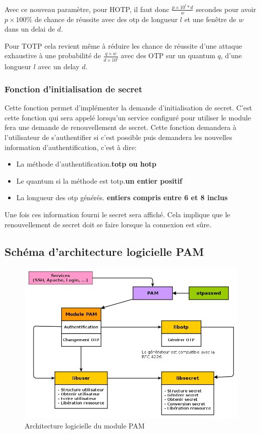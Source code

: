 Avec ce nouveau paramètre, pour HOTP, il faut donc $\frac{p\times10^{l}*d}{w}$
secondes pour avoir $p\times100\%$ de chance de réussite avec des otp de
longueur $l$ et une fenêtre de $w$ dans un delai de $d$.

Pour TOTP cela revient même à réduire les chance de réussite d'une attaque
exhaustive à une probabilité de $\frac{q\times w}{d\times10^{l}}$ avec des OTP
sur un quantum $q$, d'une longueur $l$ avec un delay $d$.


\subsubsection{Fonction d'initialisation de secret}
Cette fonction permet d'implémenter la demande d'initialisation de secret.
C'est cette fonction qui sera appelé lorsqu'un service configuré pour utiliser
le module fera une demande de renouvellement de secret. Cette fonction demandera
à l'utilisateur de s'authentifier si c'est possible puis demandera les nouvelles
information d'authentification, c'est à dire:
\begin{itemize}
  \item La méthode d'authentification.\hfill\textbf{totp ou hotp}
  \item Le quantum si la méthode est totp.\hfill \textbf{un entier positif}
  \item La longueur des otp générés.
  \hfill\textbf{entiers compris entre 6 et 8 inclus}
\end{itemize}
Une fois ces information fourni le secret sera affiché. Cela implique que le
renouvellement de secret doit se faire lorsque la connexion est sûre.
\newpage
\subsection{Schéma d'architecture logicielle PAM}
  \begin{figure}[h!]
    \centering
    \includegraphics[width=\textwidth]{../graphics/architecturepammodule.jpg}
    \caption{Architecture logicielle du module PAM}
  \end{figure}

